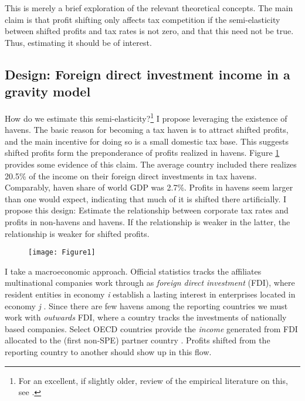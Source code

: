 \documentclass[twoside,a4paper,11pt]{article}
\begin{document}
This is merely a brief exploration of the relevant theoretical concepts. The main claim is that profit shifting only affects tax competition if the semi-elasticity between shifted profits and tax rates is not zero, and that this need not  be true. Thus, estimating it should be of interest. 

\subsection{Design: Foreign direct investment income in a gravity model}
How do we estimate this semi-elasticity?\footnote{For an excellent, if slightly older, review of the empirical literature on this, see \textcite{devereux_impact_2007}.} I propose leveraging the existence of havens. The basic reason for becoming a tax haven is to attract shifted profits, and the main incentive for doing so is a small domestic tax base. This suggests shifted profits form the preponderance of profits realized in havens.  Figure \ref{havenshare} provides some evidence of this claim. The average country included there realizes 20.5\% of the income on their foreign direct investments in tax havens. Comparably, haven share of world GDP was 2.7\%. Profits in havens seem larger than one would expect, indicating that much of it is shifted there artificially. I propose this design: Estimate the relationship between corporate tax rates and profits in non-havens and havens. If the relationship is weaker in the latter, the relationship is weaker for shifted profits. 
\begin{figure}
	\centering
	\label{havenshare}
	\texttt{[image: Figure1]}
\end{figure}

I take a macroeconomic approach. Official statistics tracks the affiliates multinational companies work through as \textit{foreign direct investment} (FDI), where resident entities in economy \textit{i} establish a lasting interest in enterprises located in economy \textit{j} \autocite[22]{oecd_oecd_2008}. Since there are few havens among the reporting countries we must work with \textit{outwards} FDI, where a country tracks the investments of nationally based companies. Select OECD countries provide the \textit{income} generated from FDI allocated to the (first non-SPE) partner country \autocite[31]{oecd_oecd_2008}. Profits shifted from the reporting country to another should show up in this flow. 
\end{document}
